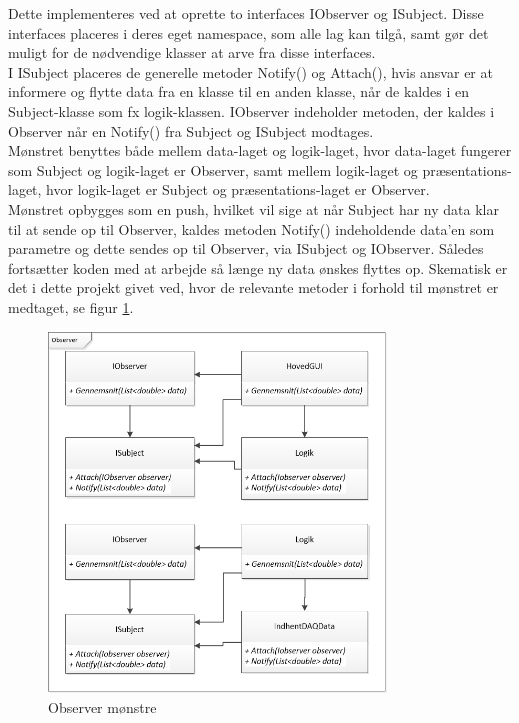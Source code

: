 Dette implementeres ved at oprette to interfaces IObserver og ISubject. Disse interfaces placeres i deres eget namespace, som alle lag kan tilgå, samt gør det muligt for de nødvendige klasser at arve fra disse interfaces. \\
I ISubject placeres de generelle metoder Notify() og Attach(), hvis ansvar er at informere og flytte data fra en klasse til en anden klasse, når de kaldes i en Subject-klasse som fx logik-klassen. IObserver indeholder metoden, der kaldes i Observer når en Notify() fra Subject og ISubject modtages.\\ Mønstret benyttes både mellem data-laget og logik-laget, hvor data-laget fungerer som Subject og logik-laget er Observer, samt mellem logik-laget og præsentations-laget, hvor logik-laget er Subject og præsentations-laget er Observer. \\
Mønstret opbygges som en push, hvilket vil sige at når Subject har ny data klar til at sende op til Observer, kaldes metoden Notify() indeholdende data’en som parametre og dette sendes op til Observer, via ISubject og IObserver. Således fortsætter koden med at arbejde så længe ny data ønskes flyttes op. Skematisk er det i dette projekt givet ved, hvor de relevante metoder i forhold til mønstret er medtaget, se figur \ref{fig:implementeret_observer_moenster}.
\begin{figure}[H]
	\centering
	\includegraphics[width=0.8\textwidth]{Figurer/ObserverStrategy}
	\caption{Observer mønstre}
	\label{fig:implementeret_observer_moenster}
\end{figure}
